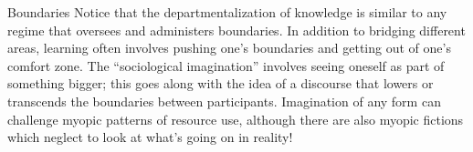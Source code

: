 \begin{notate}{Boundaries}
Notice that the departmentalization of knowledge is
similar to any regime that oversees and administers
boundaries.  In addition to bridging different areas,
learning often involves pushing one's boundaries and
getting out of one's comfort zone.  The ``sociological
imagination'' involves seeing oneself as part of something
bigger; this goes along with the idea of a discourse that
lowers or transcends the boundaries between participants.
Imagination of any form can challenge myopic patterns of
resource use, although there are also myopic fictions
which neglect to look at what's going on in reality!
\end{notate}


